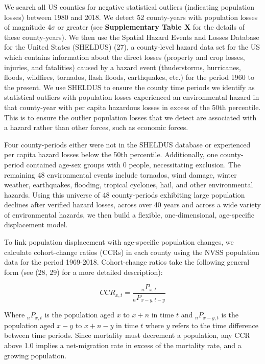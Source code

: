 \documentclass[9pt,twocolumn,twoside,]{pnas-new}
\begin{document}
We search all US counties for negative statistical outliers (indicating
population losses) between 1980 and 2018. We detect 52 county-years with
population losses of magnitude 4\(\sigma\) or greater (see
\textbf{Supplementary Table X} for the details of these county-years).
We then use the Spatial Hazard Events and Losses Database for the United
States (SHELDUS) (27), a county-level hazard data set for the US which
contains information about the direct losses (property and crop losses,
injuries, and fatalities) caused by a hazard event (thuderstorms,
hurricanes, floods, wildfires, tornados, flash floods, earthquakes,
etc.) for the period 1960 to the present. We use SHELDUS to ensure the
county time periods we identify as statistical outliers with population
losses experienced an environmental hazard in that county-year with per
capita hazardous losses in excess of the 50th percentile. This is to
ensure the outlier population losses that we detect are associated with
a hazard rather than other forces, such as economic forces.

Four county-periods either were not in the SHELDUS database or
experienced per capita hazard losses below the 50th percentile.
Additionally, one county-period contained age-sex groups with 0 people,
necessitating exclusion. The remaining 48 environmental events include
tornados, wind damage, winter weather, earthquakes, flooding, tropical
cyclones, hail, and other environmental hazards. Using this universe of
48 county-periods exhibiting large population declines after verified
hazard losses, across over 40 years and across a wide variety of
environmental hazards, we then build a flexible, one-dimensional,
age-specific displacement model.

To link population displacement with age-specific population changes, we
calculate cohort-change ratios (CCRs) in each county using the NVSS
population data for the period 1969-2018. Cohort-change ratios take the
following general form (see (28, 29) for a more detailed description):

\[CCR_{x,t}  =  \frac{_nP_{x,t}} {_nP_{x-y,t-y}} \tag{2}\]

Where \(_nP_{x,t}\) is the population aged \(x\) to \(x+n\) in time
\(t\) and \(_nP_{x-y,t}\) is the population aged \(x-y\) to \(x+n-y\) in
time \(t\) where \(y\) refers to the time difference between time
periods. Since mortality must decrement a population, any CCR above 1.0
implies a net-migration rate in excess of the mortality rate, and a
growing population.
\end{document}
